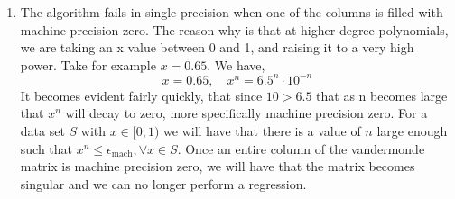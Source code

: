 \documentclass{article}
\begin{document}
\begin{enumerate}
\item 
    The algorithm fails in single precision when one of the columns is filled with machine precision zero. The reason why is that at higher degree polynomials, we are taking an x value between 0 and 1, and raising it to a very high power. Take for example $x = 0.65$. We have, 
    \[
        x= 0.65, \quad x^{n} = 6.5^{n} \cdot 10^{-n}
    \]
    It becomes evident fairly quickly, that since $10 > 6.5$ that as n becomes large that $x^n$ will decay to zero, more specifically machine precision zero. For a data set $S$ with $x \in [0, 1)$ we will have that there is a value of $n$ large enough such that $x^n \le \epsilon_{\text{mach}}, \forall x \in S$. Once an entire column of the vandermonde matrix is machine precision zero, we will have that the matrix becomes singular and we can no longer perform a regression.  

\end{enumerate}
\end{document}
